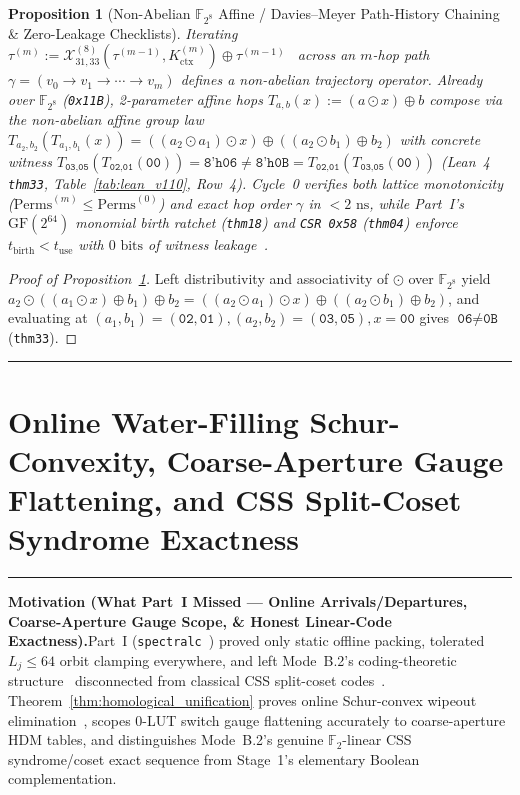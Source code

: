 \documentclass[10pt,twocolumn]{article}
\makeatletter
\newif\ifspecintwocol \specintwocolfalse
\newif\ifspecresume   \specresumefalse
\newcommand{\StartTwoCol}{%
  \if@twocolumn
    \let\spec@next\@empty
  \else
    \ifspecintwocol
      \let\spec@next\@empty
    \else
      \global\specintwocoltrue
      \def\spec@next{\begin{multicols}{2}}%
    \fi
  \fi
  \spec@next
}
\newcommand{\StopTwoCol}{%
  \if@twocolumn
    \onecolumn
    \global\specintwocolfalse
    \let\spec@next\@empty
  \else
    \ifspecintwocol
      \global\specintwocolfalse
      \def\spec@next{\end{multicols}}%
    \else
      \let\spec@next\@empty
    \fi
  \fi
  \spec@next
}
\newcommand{\BeginConnesPlate}{%
  \if@twocolumn
    \onecolumn
    \global\specresumetrue
    \let\spec@platepre\@empty
  \else
    \ifspecintwocol
      \global\specresumetrue
      \let\spec@platepre\StopTwoCol
    \else
      \global\specresumefalse
      \let\spec@platepre\@empty
    \fi
  \fi
  \spec@platepre
  \par\vspace{4pt}\noindent\textcolor{black!25}{\rule{\textwidth}{0.4pt}}\par\vspace{3pt}%
}
\newcommand{\EndConnesPlate}{%
  \par\vspace{3pt}\noindent\textcolor{black!25}{\rule{\textwidth}{0.4pt}}\par\vspace{4pt}%
  \ifspecresume
    \global\specresumefalse
    \let\spec@platepost\StartTwoCol
  \else
    \let\spec@platepost\@empty
  \fi
  \spec@platepost
}
\theoremstyle{spectralthm}
\newtheorem{proposition}[theorem]{Proposition}
\makeatother
\begin{document}
\begin{proposition}[Non-Abelian $\mathbb{F}_{2^8}$ Affine / Davies--Meyer Path-History Chaining \& Zero-Leakage Checklists]
\label{prop:nonabelian_ifc}
Iterating $\tau^{(m)} := \mathcal{X}_{31,33}^{(8)}(\tau^{(m-1)}, K_{\mathrm{ctx}}^{(m)}) \oplus \tau^{(m-1)}$~\cite{carter1979universal,daemen1995cipher} across an $m$-hop path $\gamma = (v_0 \to v_1 \to \cdots \to v_m)$ defines a non-abelian trajectory operator. Already over $\mathbb{F}_{2^8}$ (\texttt{0x11B}), 2-parameter affine hops $T_{a,b}(x) := (a \odot x) \oplus b$ compose via the non-abelian affine group law $T_{a_2,b_2}(T_{a_1,b_1}(x)) = ((a_2 \odot a_1)\odot x) \oplus ((a_2 \odot b_1) \oplus b_2)$ with concrete witness $T_{\texttt{03},\texttt{05}}(T_{\texttt{02},\texttt{01}}(\texttt{00})) = \texttt{8'h06} \neq \texttt{8'h0B} = T_{\texttt{02},\texttt{01}}(T_{\texttt{03},\texttt{05}}(\texttt{00}))$ (Lean~4 \texttt{thm33}, Table~\ref{tab:lean_v110}, Row~4). Cycle~0 verifies both lattice monotonicity ($\mathrm{Perms}^{(m)} \le \mathrm{Perms}^{(0)}$) and exact hop order $\gamma$ in $<2\text{~ns}$, while Part~I's $\mathrm{GF}(2^{64})$ monomial birth ratchet (\texttt{thm18}) and \texttt{CSR 0x58} (\texttt{thm04}) enforce $t_{\mathrm{birth}} < t_{\mathrm{use}}$ with $0\text{~bits}$ of witness leakage~\cite{goguen1982security}.
\end{proposition}
\begin{proof}[Proof of Proposition~\ref{prop:nonabelian_ifc}]
Left distributivity and associativity of $\odot$ over $\mathbb{F}_{2^8}$ yield $a_2 \odot ((a_1 \odot x) \oplus b_1) \oplus b_2 = ((a_2 \odot a_1)\odot x) \oplus ((a_2 \odot b_1)\oplus b_2)$, and evaluating at $(a_1,b_1)=(\texttt{02},\texttt{01}), (a_2,b_2)=(\texttt{03},\texttt{05}), x=\texttt{00}$ gives $\texttt{06} \neq \texttt{0B}$ (\texttt{thm33}).
\end{proof}
\EndConnesPlate

\section{Online Water-Filling Schur-Convexity, Coarse-Aperture Gauge Flattening, and CSS Split-Coset Syndrome Exactness}
\label{sec:homological}

\BeginConnesPlate
\noindent\textbf{Motivation (What Part~I Missed --- Online Arrivals/Departures, Coarse-Aperture Gauge Scope, \& Honest Linear-Code Exactness).}\;Part~I (\texttt{spectralc}~\cite{mcconnell2011certifying,calinescu2011maximizing,tarjan1983data,spielman2011graph,kamal2026cheeger}) proved only static offline packing, tolerated $L_j \le 64$ orbit clamping everywhere, and left Mode~B.2's coding-theoretic structure~\cite{ramananandro2025secure} disconnected from classical CSS split-coset codes~\cite{calderbank1996good}. Theorem~\ref{thm:homological_unification} proves online Schur-convex wipeout elimination~\cite{marshall2011inequalities}, scopes 0-LUT switch gauge flattening accurately to coarse-aperture HDM tables, and distinguishes Mode~B.2's genuine $\mathbb{F}_2$-linear CSS syndrome/coset exact sequence from Stage~1's elementary Boolean complementation.
\end{document}
